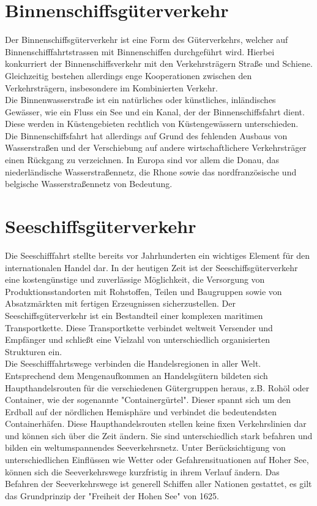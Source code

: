 \documentclass[a4paper,12pt]{scrreprt}
\begin{document}
	\section{Binnenschiffsgüterverkehr}
	Der Binnenschiffsgüterverkehr ist eine Form des Güterverkehrs, welcher auf Binnenschifffahrtstrassen mit Binnenschiffen durchgeführt wird. Hierbei konkurriert der Binnenschiffsverkehr mit den Verkehrsträgern Straße und Schiene. Gleichzeitig bestehen allerdings enge Kooperationen zwischen den Verkehrsträgern, insbesondere im Kombinierten Verkehr.\\
	
	Die Binnenwasserstraße ist ein natürliches oder künstliches, inländisches Gewässer, wie ein Fluss ein See und ein Kanal, der der Binnenschiffsfahrt dient. Diese werden in Küstengebieten rechtlich von Küstengewässern unterschieden. Die Binnenschiffsfahrt hat allerdings auf Grund des fehlenden Ausbaus von Wasserstraßen und der Verschiebung auf andere wirtschaftlichere Verkehrsträger einen Rückgang zu verzeichnen. In Europa sind vor allem die Donau, das niederländische Wasserstraßennetz, die Rhone sowie das nordfranzösische und belgische Wasserstraßennetz von Bedeutung.
	
	\section{Seeschiffsgüterverkehr}
	Die Seeschifffahrt stellte bereits vor Jahrhunderten ein wichtiges Element für den internationalen Handel dar. In der heutigen Zeit ist der Seeschiffsgüterverkehr eine kostengünstige und zuverlässige Möglichkeit, die Versorgung von Produktionsstandorten mit Rohstoffen, Teilen und Baugruppen sowie von Absatzmärkten mit fertigen Erzeugnissen sicherzustellen. Der Seeschiffsgüterverkehr ist ein Bestandteil einer komplexen maritimen Transportkette. Diese Transportkette verbindet weltweit Versender und Empfänger und schließt eine Vielzahl von unterschiedlich organisierten Strukturen ein. \\
	
	Die Seeschifffahrtswege verbinden die Handelsregionen in aller Welt. Entsprechend dem Mengenaufkommen an Handelsgütern bildeten sich Haupthandelsrouten für die verschiedenen Gütergruppen heraus, z.B. Rohöl oder Container, wie der sogenannte "Containergürtel". Dieser spannt sich um den Erdball auf der nördlichen Hemisphäre und verbindet die bedeutendsten Containerhäfen. Diese Haupthandelsrouten stellen keine fixen Verkehrslinien dar und können sich über die Zeit ändern. Sie sind unterschiedlich stark befahren und bilden ein weltumspannendes Seeverkehrsnetz. Unter Berücksichtigung von unterschiedlichen Einflüssen wie Wetter oder Gefahrensituationen auf Hoher See, können sich die Seeverkehrswege kurzfristig in ihrem Verlauf ändern. Das Befahren der Seeverkehrswege ist generell Schiffen aller Nationen gestattet, es gilt das Grundprinzip der "Freiheit der Hohen See" von 1625.\\
	
\end{document}
